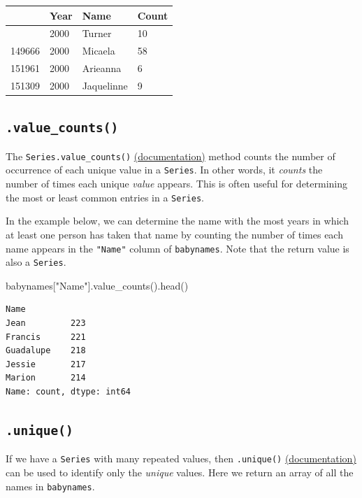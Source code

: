 \documentclass[
  letterpaper,
  DIV=11,
  numbers=noendperiod]{scrreprt}
\newenvironment{Shaded}{\begin{snugshade}}{\end{snugshade}}
\newcommand{\NormalTok}[1]{\textcolor[rgb]{0.00,0.23,0.31}{#1}}
\newcommand{\StringTok}[1]{\textcolor[rgb]{0.13,0.47,0.30}{#1}}
\begin{document}
\begin{longtable}[]{@{}llll@{}}
\toprule\noalign{}
& Year & Name & Count \\
\midrule\noalign{}
\endhead
\bottomrule\noalign{}
\endlastfoot
343868 & 2000 & Turner & 10 \\
149666 & 2000 & Micaela & 58 \\
151961 & 2000 & Arieanna & 6 \\
151309 & 2000 & Jaquelinne & 9 \\
\end{longtable}

\subsection{\texorpdfstring{\texttt{.value\_counts()}}{.value\_counts()}}\label{value_counts}

The \texttt{Series.value\_counts()}
\href{https://pandas.pydata.org/docs/reference/api/pandas.Series.value_counts.html}{(documentation)}
method counts the number of occurrence of each unique value in a
\texttt{Series}. In other words, it \emph{counts} the number of times
each unique \emph{value} appears. This is often useful for determining
the most or least common entries in a \texttt{Series}.

In the example below, we can determine the name with the most years in
which at least one person has taken that name by counting the number of
times each name appears in the \texttt{"Name"} column of
\texttt{babynames}. Note that the return value is also a
\texttt{Series}.

\begin{Shaded}
\begin{Highlighting}[]
\NormalTok{babynames[}\StringTok{"Name"}\NormalTok{].value\_counts().head()}
\end{Highlighting}
\end{Shaded}

\begin{verbatim}
Name
Jean         223
Francis      221
Guadalupe    218
Jessie       217
Marion       214
Name: count, dtype: int64
\end{verbatim}

\subsection{\texorpdfstring{\texttt{.unique()}}{.unique()}}\label{unique}

If we have a \texttt{Series} with many repeated values, then
\texttt{.unique()}
\href{https://pandas.pydata.org/docs/reference/api/pandas.unique.html}{(documentation)}
can be used to identify only the \emph{unique} values. Here we return an
array of all the names in \texttt{babynames}.
\end{document}
